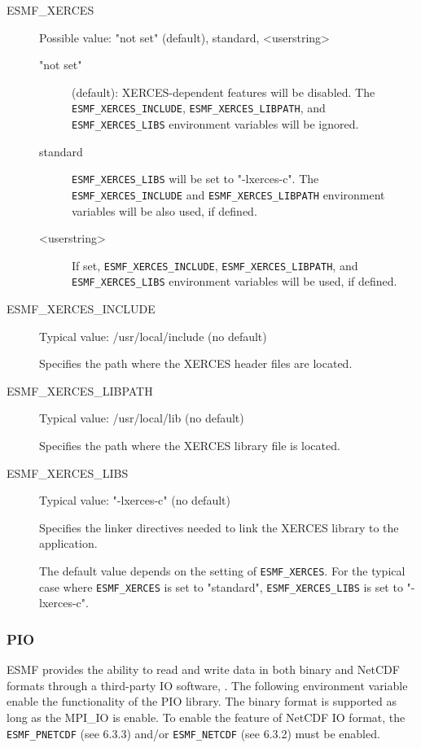 \begin{description}

\item[ESMF\_XERCES] Possible value: "not set" (default), standard, <userstring>

\begin{description}
\item["not set"] (default): XERCES-dependent features will be disabled.
The {\tt ESMF\_XERCES\_INCLUDE}, {\tt ESMF\_XERCES\_LIBPATH}, and
{\tt ESMF\_XERCES\_LIBS} environment variables will be ignored.

\item[standard] {\tt ESMF\_XERCES\_LIBS} will be set to "-lxerces-c".  
The {\tt ESMF\_XERCES\_INCLUDE} and {\tt ESMF\_XERCES\_LIBPATH}
environment variables will be also used, if defined.

\item[<userstring>] If set, {\tt ESMF\_XERCES\_INCLUDE}, {\tt ESMF\_XERCES\_LIBPATH},
and {\tt ESMF\_XERCES\_LIBS} environment variables will be used, if defined.
\end{description}

\item[ESMF\_XERCES\_INCLUDE] Typical value: /usr/local/include (no default)

Specifies the path where the XERCES header files are located.

\item[ESMF\_XERCES\_LIBPATH] Typical value: /usr/local/lib (no default)

Specifies the path where the XERCES library file is located.

\item[ESMF\_XERCES\_LIBS] Typical value: "-lxerces-c" (no default)

Specifies the linker directives needed to link the XERCES library to
the application.

The default value depends on the setting of {\tt ESMF\_XERCES}.  For the
typical case where {\tt ESMF\_XERCES} is set to "standard", {\tt ESMF\_XERCES\_LIBS} is set to "-lxerces-c". 
\end{description}


\subsubsection{PIO}
\label{sec:pio}
ESMF provides the ability to read and write data in both binary and
NetCDF formats through a third-party IO software, 
 .
The following environment variable enable the functionality of the PIO
library. The binary format is supported as long as the MPI\_IO
is enable. To enable the feature of NetCDF IO format, the
{\tt ESMF\_PNETCDF} (see 6.3.3) and/or {\tt ESMF\_NETCDF} (see 6.3.2)
must be enabled. 


